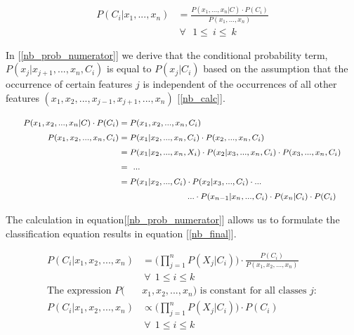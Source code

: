 	\begin{equation}
		\begin{aligned}
			P(C_i|x_1, ... , x_n) &= \frac{P(x_1, ... , x_n |C) \cdot P(C_i)}{P(x_1, ... ,x_n)} \\
			& \ \forall \ \ \  1 \leq \ i \leq \ k
		\end{aligned}
		\label{nb_post_prob}
	\end{equation}
	
		In [\ref{nb_prob_numerator}] we derive that the conditional probability term, $ P(x_j|x_{j+1}, ...,x_n,C_i) $ is equal to $ P(x_j|C_i) $ based on the assumption that the occurrence of certain features $ j $ is independent of the occurrences of all other features $ (x_1,x_2,..., x_{j-1},x_{j+1}, ...,x_n) $ [\ref{nb_calc}].
	
	\begin{equation}
		\begingroup\makeatletter\def\f@size{8}\check@mathfonts
			\begin{aligned}
				P(x_1,x_2, ..., x_n |C) \cdot P(C_i) &= P(x_1,x_2,...,x_n,C_i) \\
				P(x_1,x_2, ..., x_n,C_i) &= P(x_1|x_2, ...,x_n,C_i) \cdot P(x_2, ...,x_n,C_i) \\
				&= P(x_1|x_2, ...,x_n,X_i) \cdot P(x_2|x_3, ..., x_n, C_i) \cdot P(x_3, ..., x_n,C_i) \\
				&= \ ... \\
				&= P(x_1|x_2, ...,C_i) \cdot P(x_2|x_3, ...,C_i) \cdot ... \\
				& \ \ \ \ \ \ \ \ \ \ \ \ \ \ \ \ \ \ \ \ \ 
				... \cdot P(x_{n-1}|x_n, ...,C_i) \cdot P(x_n|C_i) \cdot P(C_i)
			\end{aligned}
		\endgroup
		\label{nb_prob_numerator}
	\end{equation}
	
		The calculation in equation[\ref{nb_prob_numerator}] allows us to formulate the classification equation results in equation [\ref{nb_final}].
	
	\begin{equation}
		\begin{aligned}
			P(C_i|x_1,x_2, ...,x_n) &= \Bigg(
			\prod_{j=1}^n  P(X_j|C_i)
			\Bigg) \cdot
			\frac{P(C_i)}{P(x_1,x_2, ..., x_n)}\\ 
			&\ \forall \ \  1 \leq i \leq k \\
			\text{The expression } P(&x_1,x_2, ...,x_n)\text{ is constant for all classes } j: \\
			P(C_i|x_1,x_2, ...,x_n)& \propto \Bigg(
			\prod_{j=1}^n  P(X_j|C_i)
			\Bigg) \cdot P(C_i) \\
			&\ \forall \ \  1 \leq i \leq k 
		\end{aligned}
		\label{nb_final}
	\end{equation}
	
